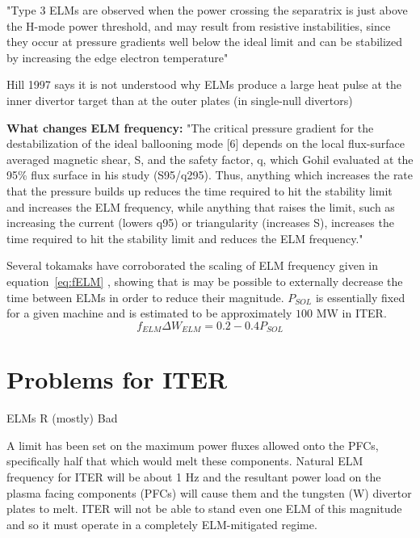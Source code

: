 \documentclass[12pt]{article}  %
\newcommand{\citep}[1]{\cite{#1}}
\begin{document}
"Type 3 ELMs are observed when the power crossing the separatrix is just above the H-mode power threshold, and may result from resistive instabilities, since they occur at pressure gradients well below the ideal limit and can be stabilized by increasing the edge electron temperature"\citep{Hill1997}

Hill 1997\cite{Hill1997} says it is not understood why ELMs produce a large heat pulse at the inner divertor target than at the outer plates (in single-null divertors)

\textbf{What changes ELM frequency:}
"The critical pressure gradient for the destabilization of the ideal ballooning mode [6] depends on the local flux-surface averaged magnetic shear, S, and the safety factor, q, which Gohil evaluated at the 95\% flux surface in his study (S95/q295). Thus, anything which increases the rate that the pressure builds up reduces the time required to hit the stability limit and increases the ELM frequency, while anything that raises the limit, such as increasing the current (lowers q95) or triangularity (increases S), increases the time required to hit the stability limit and reduces the ELM frequency."\cite{Hill1997}

Several tokamaks have corroborated the scaling of ELM frequency given in equation~\ref{eq:fELM} \cite{Leonard1999}\cite{Loarte2002}, showing that is may be possible to externally decrease the time between ELMs in order to reduce their magnitude. $P_{SOL}$ is essentially fixed for a given machine and is estimated to be approximately $100$ MW in ITER.\cite{Eich2013}
\begin{equation}\label{eq:fELM}
f_{ELM}\Delta W_{ELM} = 0.2-0.4 P_{SOL}
\end{equation}


\section{Problems for ITER}\label{sec:Problems}
ELMs R (mostly) Bad \cite{Connor2008}

A limit has been set on the maximum power fluxes allowed onto the PFCs, specifically half that which would melt these components.\cite{Loarte2014a} Natural ELM frequency for ITER will be about 1 Hz and the resultant power load on the plasma facing components (PFCs) will cause them and the tungsten (W) divertor plates to melt\cite{Federici2003}. ITER will not be able to stand even one ELM of this magnitude and so it must operate in a completely ELM-mitigated regime\cite{KirkFF}.
\end{document}
